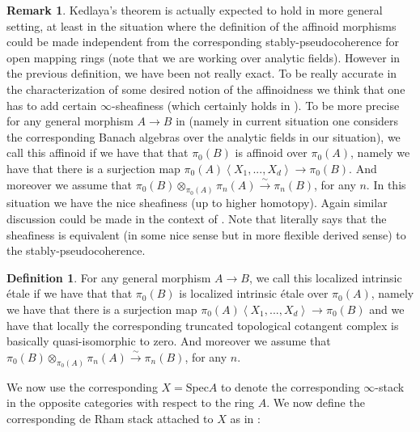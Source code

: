 \documentclass[12pt]{amsart}
\theoremstyle{definition}
\newtheorem{definition}[theorem]{Definition}
\newtheorem{remark}[theorem]{Remark}
\numberwithin{equation}{section}
\begin{document}
\begin{remark}
Kedlaya's theorem \cite[Theorem 1.4.20]{Ked1} is actually expected to hold in more general setting, at least in the situation where the definition of the affinoid morphisms could be made independent from the corresponding stably-pseudocoherence for open mapping rings (note that we are working over analytic fields). However in the previous definition, we have been not really exact. To be really accurate in the characterization of some desired notion of the affinoidness we think that one has to add certain $\infty$-sheafiness (which certainly holds in \cite{BK}). To be more precise for any general morphism $A\rightarrow B$ in \cite{BK} (namely in current situation one considers the corresponding Banach algebras over the analytic fields in our situation), we call this affinoid if we have that that $\pi_0(B)$ is affinoid over $\pi_0(A)$, namely we have that there is a surjection map $\pi_0(A)\left<X_1,...,X_d\right>\rightarrow \pi_0(B)$. And moreover we assume that $\pi_0(B)\otimes_{\pi_0(A)}\pi_n(A)\overset{\sim}{\rightarrow}\pi_n(B)$, for any $n$. In this situation we have the nice sheafiness (up to higher homotopy). Again similar discussion could be made in the context of \cite{CS}. Note that \cite[Theorem 1.4.20]{Ked1} literally says that the sheafiness is equivalent (in some nice sense but in more flexible derived sense) to the stably-pseudocoherence.
\end{remark}







\begin{definition}
For any general morphism $A\rightarrow B$, we call this localized intrinsic \'etale if we have that that $\pi_0(B)$ is localized intrinsic \'etale over $\pi_0(A)$, namely we have that there is a surjection map $\pi_0(A)\left<X_1,...,X_d\right>\rightarrow \pi_0(B)$ and we have that locally the corresponding truncated topological cotangent complex is basically quasi-isomorphic to zero. And moreover we assume that $\pi_0(B)\otimes_{\pi_0(A)}\pi_n(A)\overset{\sim}{\rightarrow}\pi_n(B)$, for any $n$.	
\end{definition}




\indent We now use the corresponding $X=\mathrm{Spec}A$ to denote the corresponding $\infty$-stack in the opposite categories with respect to the ring $A$. We now define the corresponding de Rham stack attached to $X$ as in \cite[Remark 1.2]{R}:
\end{document}
